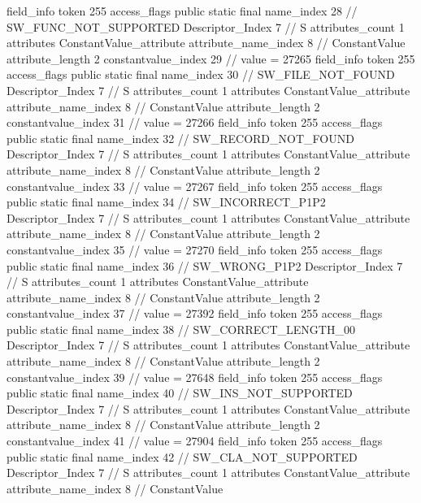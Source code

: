 {{{{			field_info {
				token	255
				access_flags	public static final
				name_index	28		// SW_FUNC_NOT_SUPPORTED
				Descriptor_Index	7		// S
				attributes_count	1
				attributes {
				ConstantValue_attribute {
					attribute_name_index	8		// ConstantValue
					attribute_length	2
					constantvalue_index	29		// value = 27265
				}
				}
			}
			field_info {
				token	255
				access_flags	public static final
				name_index	30		// SW_FILE_NOT_FOUND
				Descriptor_Index	7		// S
				attributes_count	1
				attributes {
				ConstantValue_attribute {
					attribute_name_index	8		// ConstantValue
					attribute_length	2
					constantvalue_index	31		// value = 27266
				}
				}
			}
			field_info {
				token	255
				access_flags	public static final
				name_index	32		// SW_RECORD_NOT_FOUND
				Descriptor_Index	7		// S
				attributes_count	1
				attributes {
				ConstantValue_attribute {
					attribute_name_index	8		// ConstantValue
					attribute_length	2
					constantvalue_index	33		// value = 27267
				}
				}
			}
			field_info {
				token	255
				access_flags	public static final
				name_index	34		// SW_INCORRECT_P1P2
				Descriptor_Index	7		// S
				attributes_count	1
				attributes {
				ConstantValue_attribute {
					attribute_name_index	8		// ConstantValue
					attribute_length	2
					constantvalue_index	35		// value = 27270
				}
				}
			}
			field_info {
				token	255
				access_flags	public static final
				name_index	36		// SW_WRONG_P1P2
				Descriptor_Index	7		// S
				attributes_count	1
				attributes {
				ConstantValue_attribute {
					attribute_name_index	8		// ConstantValue
					attribute_length	2
					constantvalue_index	37		// value = 27392
				}
				}
			}
			field_info {
				token	255
				access_flags	public static final
				name_index	38		// SW_CORRECT_LENGTH_00
				Descriptor_Index	7		// S
				attributes_count	1
				attributes {
				ConstantValue_attribute {
					attribute_name_index	8		// ConstantValue
					attribute_length	2
					constantvalue_index	39		// value = 27648
				}
				}
			}
			field_info {
				token	255
				access_flags	public static final
				name_index	40		// SW_INS_NOT_SUPPORTED
				Descriptor_Index	7		// S
				attributes_count	1
				attributes {
				ConstantValue_attribute {
					attribute_name_index	8		// ConstantValue
					attribute_length	2
					constantvalue_index	41		// value = 27904
				}
				}
			}
			field_info {
				token	255
				access_flags	public static final
				name_index	42		// SW_CLA_NOT_SUPPORTED
				Descriptor_Index	7		// S
				attributes_count	1
				attributes {
				ConstantValue_attribute {
					attribute_name_index	8		// ConstantValue
}}}}}}}

